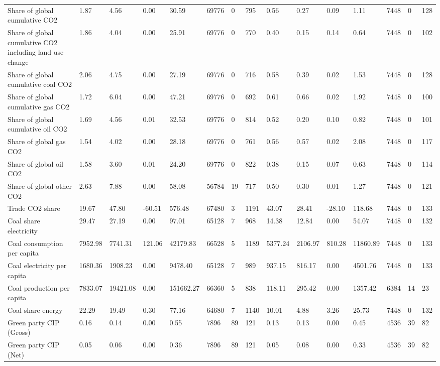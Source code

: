 \begin{longtable}{lllllllllllllll}
Share of global cumulative CO2 & 1.87 & 4.56 & 0.00 & 30.59 & 69776 & 0 & 795 & 0.56 & 0.27 & 0.09 & 1.11 & 7448 & 0 & 128\\
Share of global cumulative CO2 including land use change & 1.86 & 4.04 & 0.00 & 25.91 & 69776 & 0 & 770 & 0.40 & 0.15 & 0.14 & 0.64 & 7448 & 0 & 102\\
Share of global cumulative coal CO2 & 2.06 & 4.75 & 0.00 & 27.19 & 69776 & 0 & 716 & 0.58 & 0.39 & 0.02 & 1.53 & 7448 & 0 & 128\\
Share of global cumulative gas CO2 & 1.72 & 6.04 & 0.00 & 47.21 & 69776 & 0 & 692 & 0.61 & 0.66 & 0.02 & 1.92 & 7448 & 0 & 100\\
\addlinespace
Share of global cumulative oil CO2 & 1.69 & 4.56 & 0.01 & 32.53 & 69776 & 0 & 814 & 0.52 & 0.20 & 0.10 & 0.82 & 7448 & 0 & 101\\
Share of global gas CO2 & 1.54 & 4.02 & 0.00 & 28.18 & 69776 & 0 & 761 & 0.56 & 0.57 & 0.02 & 2.08 & 7448 & 0 & 117\\
Share of global oil CO2 & 1.58 & 3.60 & 0.01 & 24.20 & 69776 & 0 & 822 & 0.38 & 0.15 & 0.07 & 0.63 & 7448 & 0 & 114\\
Share of global other CO2 & 2.63 & 7.88 & 0.00 & 58.08 & 56784 & 19 & 717 & 0.50 & 0.30 & 0.01 & 1.27 & 7448 & 0 & 121\\
Trade CO2 share & 19.67 & 47.80 & -60.51 & 576.48 & 67480 & 3 & 1191 & 43.07 & 28.41 & -28.10 & 118.68 & 7448 & 0 & 133\\
\addlinespace
Coal share electricity & 29.47 & 27.19 & 0.00 & 97.01 & 65128 & 7 & 968 & 14.38 & 12.84 & 0.00 & 54.07 & 7448 & 0 & 132\\
Coal consumption per capita & 7952.98 & 7741.31 & 121.06 & 42179.83 & 66528 & 5 & 1189 & 5377.24 & 2106.97 & 810.28 & 11860.89 & 7448 & 0 & 133\\
Coal electricity per capita & 1680.36 & 1908.23 & 0.00 & 9478.40 & 65128 & 7 & 989 & 937.15 & 816.17 & 0.00 & 4501.76 & 7448 & 0 & 133\\
Coal production per capita & 7833.07 & 19421.08 & 0.00 & 151662.27 & 66360 & 5 & 838 & 118.11 & 295.42 & 0.00 & 1357.42 & 6384 & 14 & 23\\
Coal share energy & 22.29 & 19.49 & 0.30 & 77.16 & 64680 & 7 & 1140 & 10.01 & 4.88 & 3.26 & 25.73 & 7448 & 0 & 132\\
\addlinespace
Green party CIP (Gross) & 0.16 & 0.14 & 0.00 & 0.55 & 7896 & 89 & 121 & 0.13 & 0.13 & 0.00 & 0.45 & 4536 & 39 & 82\\
Green party CIP (Net) & 0.05 & 0.06 & 0.00 & 0.36 & 7896 & 89 & 121 & 0.05 & 0.08 & 0.00 & 0.33 & 4536 & 39 & 82\\

\end{longtable}
